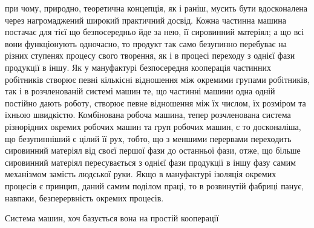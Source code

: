 при чому, природно, теоретична концепція, як і раніш, мусить
бути вдосконалена через нагромаджений широкий практичний
досвід. Кожна частинна машина постачає для тієї що безпосередньо
йде за нею, її сировинний матеріял; а що всі вони функціонують
одночасно, то продукт так само безупинно перебуває на
різних ступенях процесу свого творення, як і в процесі переходу
з однієї фази продукції в іншу. Як у мануфактурі безпосередня
кооперація частинних робітників створює певні кількісні відношення
між окремими групами робітників, так і в розчленованій
системі машин те, що частинні машини одна одній постійно дають
роботу, створює певне відношення між їх числом, їх розміром
та їхньою швидкістю. Комбінована робоча машина, тепер розчленована
система різнорідних окремих робочих машин та груп
робочих машин, є то досконаліша, що безупинніший є цілий її
рух, тобто, що з меншими перервами переходить сировинний матеріял
від своєї першої фази до останньої фази, отже, що більше
сировинний матеріял пересувається з однієї фази продукції в
іншу фазу самим механізмом замість людської руки. Якщо в
мануфактурі ізоляція окремих процесів є принцип, даний самим
поділом праці, то в розвинутій фабриці панує, навпаки, безперервність
окремих процесів.

Система машин, хоч базується вона на простій кооперації
\parbreak{}  %
